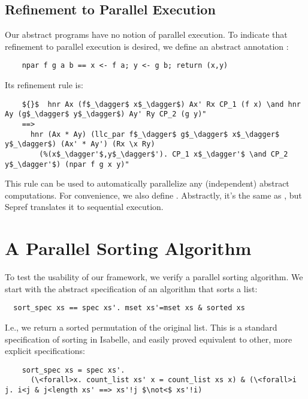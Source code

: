 \documentclass[sn-mathphys,Numbered]{sn-jnl}
\theoremstyle{thmstyleone}%
\theoremstyle{definition}%
\theoremstyle{thmstylethree}%
\begin{document}
  \subsection{Refinement to Parallel Execution}
  Our abstract programs have no notion of parallel execution.
  To indicate that refinement to parallel execution is desired, we define an abstract annotation
  :
  \begin{lstlisting}
    npar f g a b == x <- f a; y <- g b; return (x,y)
  \end{lstlisting}
  Its refinement rule is:
  \begin{lstlisting}
    ${}$  hnr Ax (f$_\dagger$ x$_\dagger$) Ax' Rx CP_1 (f x) \and hnr Ay (g$_\dagger$ y$_\dagger$) Ay' Ry CP_2 (g y)"
    ==>
      hnr (Ax * Ay) (llc_par f$_\dagger$ g$_\dagger$ x$_\dagger$ y$_\dagger$) (Ax' * Ay') (Rx \x Ry)
        (%(x$_\dagger'$,y$_\dagger$'). CP_1 x$_\dagger'$ \and CP_2 y$_\dagger'$) (npar f g x y)"
  \end{lstlisting}
  This rule can be used to automatically parallelize any (independent) abstract computations.
  For convenience, we also define . Abstractly, it's the same as ,
  but Sepref translates it to sequential execution.


  \section{A Parallel Sorting Algorithm}\label{sec:parsort}
  To test the usability of our framework, we verify a parallel sorting algorithm.
  We start with the abstract specification of an algorithm that sorts a list:
  \begin{lstlisting}
  sort_spec xs == spec xs'. mset xs'=mset xs & sorted xs
  \end{lstlisting}
  I.e., we return a sorted permutation of the original list.
  This is a standard specification of sorting in Isabelle, and easily proved equivalent to other, more explicit specifications:
  \begin{lstlisting}
    sort_spec xs = spec xs'.
      (\<forall>x. count_list xs' x = count_list xs x) & (\<forall>i j. i<j & j<length xs' ==> xs'!j $\not<$ xs'!i)
  \end{lstlisting}
\end{document}
